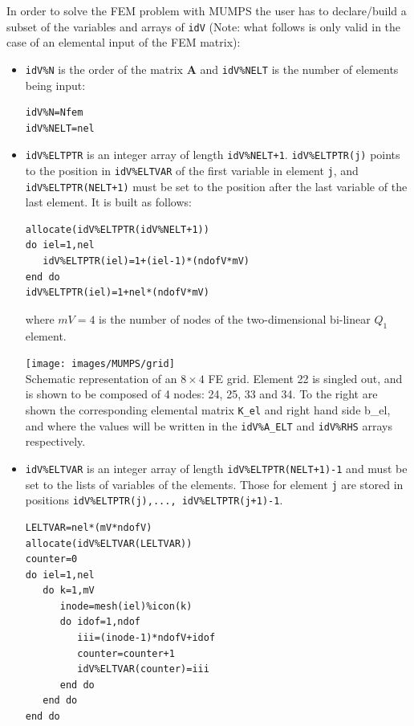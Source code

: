 In order to solve the FEM problem with MUMPS the user has to declare/build 
a subset of the variables and arrays of {\tt idV} (Note: what follows is only valid in 
the case of an elemental input of the FEM matrix):
\begin{itemize}
\item {\tt idV\%N} is the order of the matrix ${\bm A}$
and {\tt idV\%NELT} is the number of elements being input:
\begin{verbatim}
idV%N=Nfem    
idV%NELT=nel
\end{verbatim}

\item {\tt idV\%ELTPTR} is an integer array of 
length {\tt idV\%NELT+1}. {\tt idV\%ELTPTR(j)} points to the position in {\tt idV\%ELTVAR}
of the first variable in element {\tt j}, and {\tt idV\%ELTPTR(NELT+1)} must be set to 
the position after the last variable of the last element. It is built as follows: 

\begin{lstlisting}
allocate(idV%ELTPTR(idV%NELT+1))
do iel=1,nel                         
   idV%ELTPTR(iel)=1+(iel-1)*(ndofV*mV)   
end do                         
idV%ELTPTR(iel)=1+nel*(ndofV*mV) 
\end{lstlisting}
where $mV=4$ is the number of nodes of the two-dimensional bi-linear $Q_1$ element.

\begin{center}
\texttt{[image: images/MUMPS/grid]}\\
{\captionfont Schematic representation of an $8\times4$ FE grid. 
Element 22 is singled out, and is shown to
be composed of 4 nodes: 24, 25, 33 and 34. To the right are shown the corresponding elemental
matrix {\tt K\_el} and right hand side {b\_el}, and where the values will be written in the
{\tt idV\%A\_ELT} and {\tt idV\%RHS} arrays respectively.}
\end{center}


\item {\tt idV\%ELTVAR} is an integer array of length {\tt idV\%ELTPTR(NELT+1)-1} and must 
be set to the lists of variables of the elements. 
Those for element {\tt j} are stored in positions {\tt idV\%ELTPTR(j),..., idV\%ELTPTR(j+1)-1}. 
\begin{verbatim}
LELTVAR=nel*(mV*ndofV)  
allocate(idV%ELTVAR(LELTVAR))
counter=0   
do iel=1,nel 
   do k=1,mV    
      inode=mesh(iel)%icon(k)  
      do idof=1,ndof    
         iii=(inode-1)*ndofV+idof   
         counter=counter+1         
         idV%ELTVAR(counter)=iii   
      end do                   
   end do                 
end do               
\end{verbatim}



\end{itemize}

